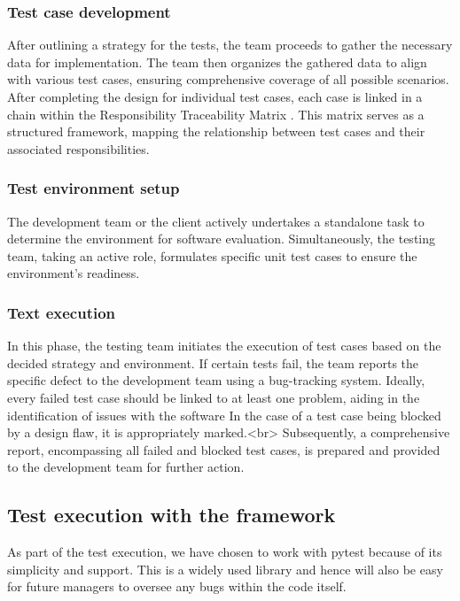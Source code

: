 \subsubsection{Test case development}
After outlining a strategy for the tests, the team proceeds to gather the necessary data for implementation.
The team then organizes the gathered data to align with various test cases, ensuring comprehensive coverage of all possible scenarios.
After completing the design for individual test cases, each case is linked in a chain within the Responsibility Traceability Matrix \cite{ref33}.
This matrix serves as a structured framework, mapping the relationship between test cases and their associated responsibilities.

\subsubsection{Test environment setup}
The development team or the client actively undertakes a standalone task to determine the environment for software evaluation.
Simultaneously, the testing team, taking an active role, formulates specific unit test cases to ensure the environment's readiness.

\subsubsection{Text execution}
In this phase, the testing team initiates the execution of test cases based on the decided strategy and environment.
If certain tests fail, the team reports the specific defect to the development team using a bug-tracking system.
Ideally, every failed test case should be linked to at least one problem, aiding in the identification of issues with the software \cite{ref34}
In the case of a test case being blocked by a design flaw, it is appropriately marked.<br>
Subsequently, a comprehensive report, encompassing all failed and blocked test cases, is prepared and provided to the development team for further action.

\subsection{Test execution with the framework}
As part of the test execution, we have chosen to work with pytest because of its simplicity and support.
This is a widely used library and hence will also be easy for future managers to oversee any bugs within the code itself.

